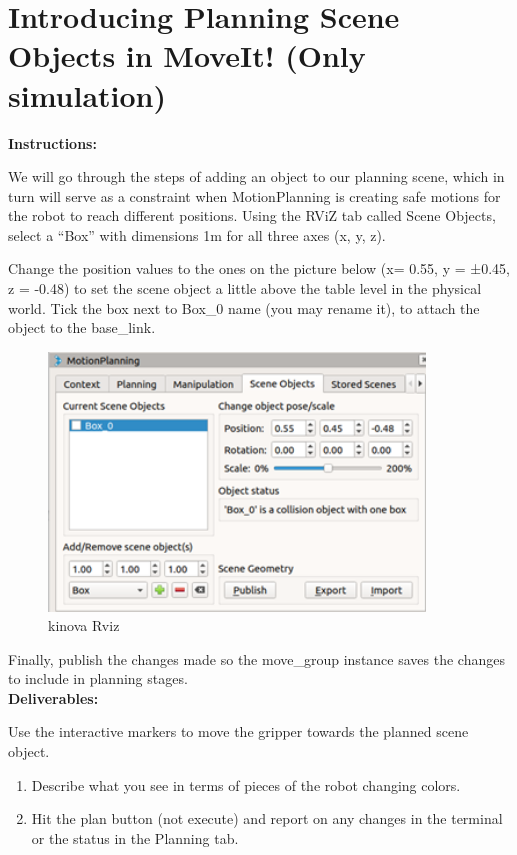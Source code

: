 \documentclass[12pt]{article}
\begin{document}
\section{Introducing Planning Scene Objects in MoveIt! (Only simulation)}



\textbf{Instructions:}

We will go through the steps of adding an object to our planning scene, which in turn will serve as a constraint when MotionPlanning is creating safe motions for the robot to reach different positions. Using the RViZ tab called Scene Objects, select a “Box” with dimensions 1m for all three axes (x, y, z).

Change the position values to the ones on the picture below (x= 0.55, y = ±0.45, z = -0.48) to set the scene object a little above the table level in the physical world. 
Tick the box next to Box\_0 name (you may rename it), to attach the object to the base\_link.

\begin{figure}[H]
    \vspace{-10pt}
    \centering\includegraphics[width=10cm]{images/motionPlanning.png}\vspace{10pt}
    \caption{kinova Rviz}\label{fig:kinovarviz}
    \end{figure}

Finally, publish the changes made so the move\_group instance saves the changes to include in planning stages.\\

\textbf{Deliverables:}

Use the interactive markers to move the gripper towards the planned scene object. 
    \begin{enumerate}
        \item Describe what you see in terms of pieces of the robot changing colors.
        \item Hit the plan button (not execute) and report on any changes in the terminal or the status in the Planning tab.
    \end{enumerate}
\end{document}
